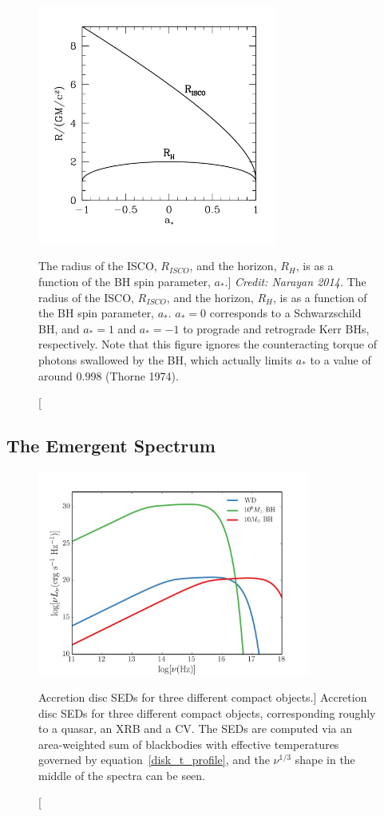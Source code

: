 \nocite{narayan2014, thorne1974}
\begin{figure}
\centering
\includegraphics[width=0.7\textwidth]{figures/01-intro/isco.png}
\caption
[The radius of the ISCO, $R_{ISCO}$, and the horizon, $R_H$,
is as a function of the BH spin parameter, $a_*$.]
{
{\sl Credit: Narayan 2014.}
The radius of the ISCO, $R_{ISCO}$, and the horizon, $R_H$,
is as a function of the BH spin parameter, $a_*$. 
$a_*=0$ corresponds to a Schwarzschild BH, and $a_*=1$ and $a_*=-1$
to prograde and retrograde Kerr BHs, respectively. Note that
this figure ignores the counteracting torque of photons swallowed by the BH,
which actually limits $a_*$ to a value of around $0.998$ (Thorne 1974).  
} 
\label{fig:isco}
\end{figure}


\subsection{The Emergent Spectrum}


\begin{figure}
\centering
\includegraphics[width=0.8\textwidth]{figures/01-intro/disc_seds.png}
\caption
[Accretion disc SEDs for three different compact objects.]
{
Accretion disc SEDs for three different compact objects, corresponding roughly
to a quasar, an XRB and a CV. The SEDs are computed via an area-weighted sum
of blackbodies with effective temperatures governed by equation~\ref{disk_t_profile},
and the $\nu^{1/3}$ shape in the middle of the spectra can be seen.
} 
\label{fig:disc_seds}
\end{figure}

